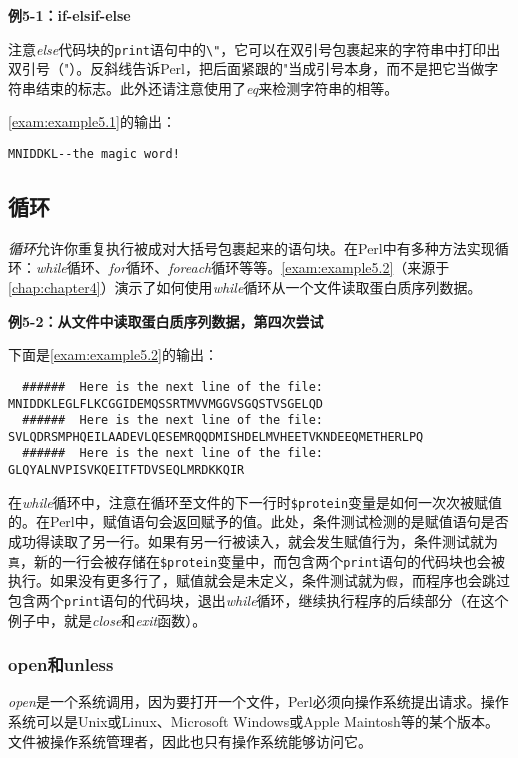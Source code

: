 \textbf{例5-1：if-elsif-else}


注意\textit{else}代码块的\verb|print|语句中的\verb|\"|，它可以在双引号包裹起来的字符串中打印出双引号（"）。反斜线告诉Perl，把后面紧跟的"当成引号本身，而不是把它当做字符串结束的标志。此外还请注意使用了\textit{eq}来检测字符串的相等。

\autoref{exam:example5.1}的输出：

\begin{lstlisting}
MNIDDKL--the magic word!
\end{lstlisting}

\subsection{循环}
\textit{循环}允许你重复执行被成对大括号包裹起来的语句块。在Perl中有多种方法实现循环：\textit{while}循环、\textit{for}循环、\textit{foreach}循环等等。\autoref{exam:example5.2}（来源于\autoref{chap:chapter4}）演示了如何使用\textit{while}循环从一个文件读取蛋白质序列数据。

\textbf{例5-2：从文件中读取蛋白质序列数据，第四次尝试}


下面是\autoref{exam:example5.2}的输出：

\begin{lstlisting}
  ######  Here is the next line of the file:
MNIDDKLEGLFLKCGGIDEMQSSRTMVVMGGVSGQSTVSGELQD
  ######  Here is the next line of the file:
SVLQDRSMPHQEILAADEVLQESEMRQQDMISHDELMVHEETVKNDEEQMETHERLPQ
  ######  Here is the next line of the file:
GLQYALNVPISVKQEITFTDVSEQLMRDKKQIR
\end{lstlisting}

在\textit{while}循环中，注意在循环至文件的下一行时\verb|$protein|变量是如何一次次被赋值的。在Perl中，赋值语句会返回赋予的值。此处，条件测试检测的是赋值语句是否成功得读取了另一行。如果有另一行被读入，就会发生赋值行为，条件测试就为\verb|真|，新的一行会被存储在\verb|$protein|变量中，而包含两个\verb|print|语句的代码块也会被执行。如果没有更多行了，赋值就会是未定义，条件测试就为\verb|假|，而程序也会跳过包含两个\verb|print|语句的代码块，退出\textit{while}循环，继续执行程序的后续部分（在这个例子中，就是\textit{close}和\textit{exit}函数）。

\subsubsection{open和unless}
\textit{open}是一个系统调用，因为要打开一个文件，Perl必须向操作系统提出请求。操作系统可以是Unix或Linux、Microsoft Windows或Apple Maintosh等的某个版本。文件被操作系统管理者，因此也只有操作系统能够访问它。

